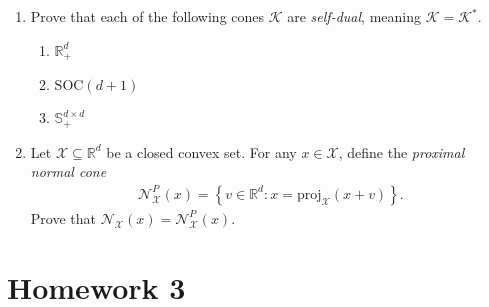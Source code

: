 \documentclass[12pt]{article}
\numberwithin{equation}{section}
\newcommand{\RR}{\mathbb{R}}
\newcommand{\cX}{\mathcal{X}}
\newcommand{\cN}{\mathcal{N}}
\newcommand{\SOC}{\mathrm{SOC}}
\newcommand{\cK}{\mathcal{K}}
\newcommand{\proj}{\mathrm{proj}}
\theoremstyle{remark}
\begin{document}
\begin{enumerate}
 \item Prove that each of the following cones $\cK$ are \emph{self-dual}, meaning $\cK = \cK^\ast$. 
 \begin{enumerate}
 \item $\RR_+^d$
 \item $\SOC(d+1)$ 
 \item $\mathbb{S}_+^{d\times d}$
 \end{enumerate}
  \item Let $\cX \subseteq \RR^d$ be a closed convex set. For any $x \in \cX$, define the \emph{proximal normal cone} 
 \begin{align*}
 \cN_{\cX}^P(x) = \left\{ v \in \RR^d \colon x = \proj_{\cX}(x + v) \right\}.
 \end{align*}
 Prove that 
 $
 \cN_{\cX}(x) = \cN_{\cX}^P(x).
 $
\end{enumerate}
\newpage

\section{Homework 3}
\end{document}
